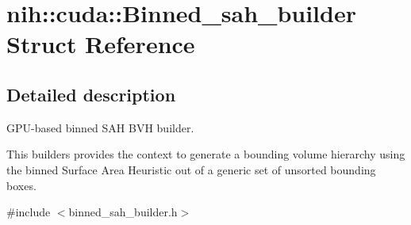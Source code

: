 \hypertarget{structnih_1_1cuda_1_1_binned__sah__builder}{}\section{nih\+:\+:cuda\+:\+:Binned\+\_\+sah\+\_\+builder Struct Reference}
\label{structnih_1_1cuda_1_1_binned__sah__builder}


\subsection{Detailed description}
G\+P\+U-\/based binned S\+AH B\+VH builder.

This builders provides the context to generate a bounding volume hierarchy using the binned Surface Area Heuristic out of a generic set of unsorted bounding boxes. 

{\ttfamily \#include $<$binned\+\_\+sah\+\_\+builder.\+h$>$}

